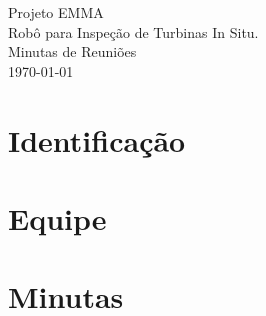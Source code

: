 \documentclass[12pt,a4paper]{article}
\begin{document}
\pagestyle{fancy}%
\thispagestyle{fancy}%
\renewcommand{\headrulewidth}  {0.4pt}%
\renewcommand{\footrulewidth}  {0.4pt}%

\vfill%
\begin{center}
  {\GRANDE Projeto EMMA} \\[5mm]
  {\Grande Robô para Inspeção de Turbinas In Situ.} \\[25mm]
  {\Grande Minutas de Reuniões} \\
  \vfill%
  {\Large \today} \\[8mm]
\end{center}

\newpage%
\pagestyle{fancy}%
\thispagestyle{fancy}%
\renewcommand{\headrulewidth}  {0.4pt}%
\renewcommand{\footrulewidth}  {0.4pt}%
%
%
\rhead{\sf\thepage}%
%
\cfoot{}%
\rfoot{\sf [\hours] \quad \today}%
 
\tableofcontents

\newpage%
\section{Identificação}



\newpage%
\section{Equipe}



\newpage%
\section{Minutas}
 
\end{document}
